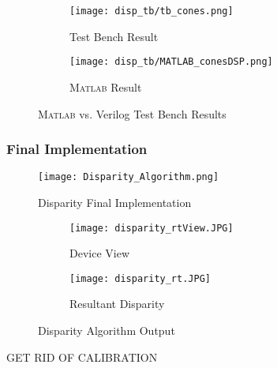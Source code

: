 \par
\begin{figure}[H] 
         \begin{subfigure}[h]{0.5\textwidth}
              \centerline{\texttt{[image: disp\_tb/tb\_cones.png]}}
             \caption{Test Bench Result}
         \end{subfigure}
         \begin{subfigure}[h]{0.5\textwidth}
             \centerline{\texttt{[image: disp\_tb/MATLAB\_conesDSP.png]}}
             \caption{\textsc{Matlab} Result}
         \end{subfigure}
\caption{\textsc{Matlab} vs. Verilog Test Bench Results}
\label{disparityVerilogvsMatlab}
\end{figure}


\subsubsection{Final Implementation}
\begin{figure}[H]
	\centerline{\texttt{[image: Disparity\_Algorithm.png]}}
	\caption{Disparity Final Implementation}
	\label{disparityTestImp}
\end{figure}
\par
\begin{figure}[H] 
	\begin{subfigure}{0.5\textwidth}
	\centering
		\texttt{[image: disparity\_rtView.JPG]}
		\caption{Device View}
	\end{subfigure}
	\begin{subfigure}{0.5\textwidth}
	\centering
		\texttt{[image: disparity\_rt.JPG]}
		\caption{Resultant Disparity}
	\end{subfigure}
	\caption{Disparity Algorithm Output}
	\label{disparityFin}
\end{figure}
\par
GET RID OF CALIBRATION 